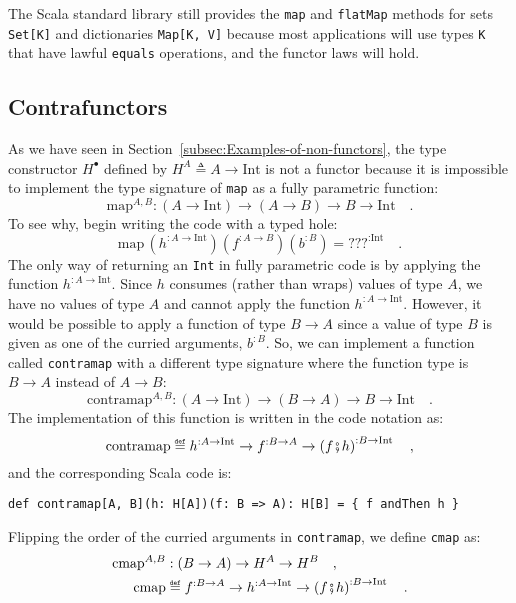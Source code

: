 The Scala standard library still provides the \lstinline!map! and
\lstinline!flatMap! methods for sets \lstinline!Set[K]! and dictionaries
\lstinline!Map[K, V]! because most applications will use types \lstinline!K!
that have lawful \lstinline!equals! operations, and the functor laws
will hold.

\subsection{Contrafunctors\label{subsec:Contrafunctors}}

As we have seen in Section~\ref{subsec:Examples-of-non-functors},
the type constructor $H^{\bullet}$ defined by $H^{A}\triangleq A\rightarrow\text{Int}$
is not a functor because it is impossible to implement the type signature
of \lstinline!map! as a fully parametric function:
\[
\text{map}^{A,B}:\left(A\rightarrow\text{Int}\right)\rightarrow\left(A\rightarrow B\right)\rightarrow B\rightarrow\text{Int}\quad.
\]
To see why, begin writing the code with a typed hole:
\[
\text{map}\,(h^{:A\rightarrow\text{Int}})(f^{:A\rightarrow B})(b^{:B})=\text{???}^{:\text{Int}}\quad.
\]
The only way of returning an \lstinline!Int! in fully parametric
code is by applying the function $h^{:A\rightarrow\text{Int}}$. Since
$h$ consumes (rather than wraps) values of type $A$, we have no
values of type $A$ and cannot apply the function $h^{:A\rightarrow\text{Int}}$.
However, it would be possible to apply a function of type $B\rightarrow A$
since a value of type $B$ is given as one of the curried arguments,
$b^{:B}$. So, we can implement a function called \lstinline!contramap!
with a different type signature where the function type is $B\rightarrow A$
instead of $A\rightarrow B$: 
\[
\text{contramap}^{A,B}:\left(A\rightarrow\text{Int}\right)\rightarrow\left(B\rightarrow A\right)\rightarrow B\rightarrow\text{Int}\quad.
\]
The implementation of this function is written in the code notation
as:
\[
\text{contramap}\triangleq h^{:A\rightarrow\text{Int}}\rightarrow f^{:B\rightarrow A}\rightarrow\left(f\bef h\right)^{:B\rightarrow\text{Int}}\quad,
\]
and the corresponding Scala code is:
\begin{lstlisting}
def contramap[A, B](h: H[A])(f: B => A): H[B] = { f andThen h }
\end{lstlisting}
Flipping the order of the curried arguments in \lstinline!contramap!,
we define \lstinline!cmap! as:
\begin{align}
\text{cmap}^{A,B} & :\left(B\rightarrow A\right)\rightarrow H^{A}\rightarrow H^{B}\quad,\nonumber \\
\text{cmap} & \triangleq f^{:B\rightarrow A}\rightarrow h^{:A\rightarrow\text{Int}}\rightarrow\left(f\bef h\right)^{:B\rightarrow\text{Int}}\quad.\label{eq:f-example-1-contrafmap}
\end{align}
